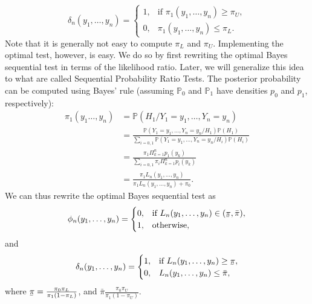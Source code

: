 \documentclass[a4paper,english,12pt]{article}
\newcommand{\spc}{\mathbb{P}}
\newcommand{\ubar}[1]{\underaccent{\bar}{#1}}
\begin{document}
 \begin{equation}
 \delta_{n}(y_{1},\ldots,y_{n})=
 \begin{cases}
 1,& \text{if }\pi_{1}(y_{1},\ldots,y_{n})\geq\pi_{U},\\
 0,& \pi_{1}(y_{1},\ldots,y_{n})\leq\pi_{L}.
 \end{cases}
 \end{equation}
 Note that it is generally not easy to compute $\pi_{L}$ and $\pi_{U}$. Implementing the optimal test, however, is easy. We do so by first rewriting the optimal Bayes sequential test in terms of the likelihood ratio. Later, we will generalize this idea to what are called Sequential Probability Ratio Tests. The posterior probability can be computed using Bayes' rule (assuming $\spc_{0}$ and $\spc_{1}$ have densities $p_{0}$ and $p_{1}$, respectively):
 \begin{align*}
 \pi_{1}(y_{1}\ldots,y_{n})&=\spc(H_{1}/Y_{1}=y_{1},\ldots,Y_{n}=y_{n})\\
 &=\frac{\spc(Y_{1}=y_{1},\ldots,Y_{n}=y_{n}/H_{1})\spc(H_{1})}{\sum_{i=0,1}\spc(Y_{1}=y_{1},\ldots,Y_{n}=y_{n}/H_{i})\spc(H_{i})}\\
 &=\frac{\pi_{1}\Pi_{k=1}^{n}p_{1}(y_{k})}{\sum_{i=0,1}\pi_{i}\Pi_{k=1}^{n}p_{i}(y_{k})}\\
 &=\frac{\pi_{1}L_{n}(y_{1},\ldots,y_{n})}{\pi_{1}L_{n}(y_{1},\ldots,y_{n})+\pi_{0}}.
 \end{align*}
 We can thus rewrite the optimal Bayes sequential test as
 \begin{equation}
 \phi_{n}(y_{1},\ldots,y_{n})=
 \begin{cases}
 0,& \text{if }L_{n}(y_{1},\ldots,y_{n})\in(\ubar{\pi},\bar{\pi}),\\
 1,& \text{otherwise},
 \end{cases}
 \end{equation}
 and
 \begin{equation}
 \delta_{n}(y_{1},\ldots,y_{n})=
 \begin{cases}
 1,& \text{if }L_{n}(y_{1},\ldots,y_{n})\geq\ubar{\pi},\\
 0,& L_{n}(y_{1},\ldots,y_{n})\leq\bar{\pi},
 \end{cases}
 \end{equation}
 where $\ubar{\pi}=\frac{\pi_{0}\pi_{L}}{\pi_{1}(1-\pi_{L})}$, and $\bar{\pi}\frac{\pi_{0}\pi_{U}}{\pi_{1}(1-\pi_{U})}$.
\end{document}
